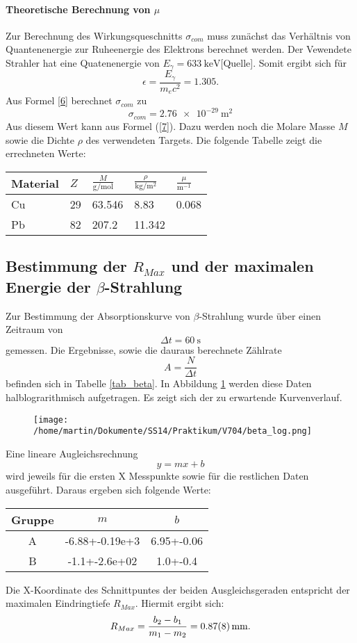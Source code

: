\documentclass[11pt,ngerman,a4paper]{article}
\begin{document}
\paragraph{Theoretische Berechnung von $\mu$}
Zur Berechnung des Wirkungsqueschnitts $\sigma_{com}$ muss zunächst das Verhältnis von Quantenenergie zur Ruheenergie des Elektrons berechnet werden. Der Vewendete Strahler hat eine Quatenenergie von $E_\gamma = \SI{633}{\kilo\eV}$[Quelle]. Somit ergibt sich für 
\[
\epsilon =  \frac{E_\gamma}{m_ec^2} = \num{1.305}.
\]
Aus Formel \ref{6} berechnet $\sigma_{com}$ zu
\[
\sigma_{com} = \SI{2.76e-29}{\meter\squared}
\]
Aus diesem Wert kann aus Formel (\ref{7}). Dazu werden noch die Molare Masse $M$ sowie die Dichte $\rho$ des verwendeten Targets. Die folgende Tabelle zeigt die errechneten Werte:
\begin{table}[h]
\centering
\begin{tabular}{lllll}
\toprule
	Material & $Z$ & $\frac{M}{\si{\gram\per\mole}}$ &$\frac{\rho}{\si{\kilo\gram\per\meter\squared}}$ &$\frac{\mu}{\si{\meter^{-1}}}$ \\
\midrule
	Cu & 29 &63.546  &8.83 & 0.068\\
	Pb &82 & 207.2& 11.342 &     \\
\bottomrule
\end{tabular}

\end{table} 
\subsection{Bestimmung der $R_{Max}$ und der maximalen Energie der $\beta$-Strahlung}
Zur Bestimmung der Absorptionskurve von $\beta$-Strahlung wurde über einen Zeitraum von
\[
\Delta t = \SI{60}{\second}
\]
gemessen. Die Ergebnisse, sowie die dauraus berechnete Zählrate
\[
A = \frac{N}{\Delta t}
\]
befinden sich in Tabelle \ref{tab_beta}. In Abbildung \ref{abb_beta} werden diese Daten halblograrithmisch aufgetragen. Es zeigt sich der zu erwartende Kurvenverlauf. 
\begin{figure}[htp]
\centering
\texttt{[image: /home/martin/Dokumente/SS14/Praktikum/V704/beta\_log.png]}
\caption{}
\label{abb_beta}
\end{figure}
\newpage
Eine lineare Augleichsrechnung
\[
y=m x +b
\]
wird jeweils für die ersten X Messpunkte sowie für die restlichen Daten ausgeführt. Daraus ergeben sich folgende Werte:
\begin{table}[h]
\centering
\begin{tabular}{cSS}
	\toprule
	Gruppe & $m$ & $b$\\
	\midrule
	A & -6.88+-0.19e+3 & 6.95+-0.06 \\
	B & -1.1+-2.6e+02 & 1.0+-0.4\\
	\bottomrule
\end{tabular}

\end{table}
Die X-Koordinate des Schnittpuntes der beiden Ausgleichsgeraden entspricht der maximalen Eindringtiefe $R_{Max}$. Hiermit ergibt sich:
\begin{equation}
R_{Max} = \frac{b_2-b_1}{m_1-m_2} = \SI{0.87+-0.08}{\milli\meter}.
\end{equation}
\end{document}
